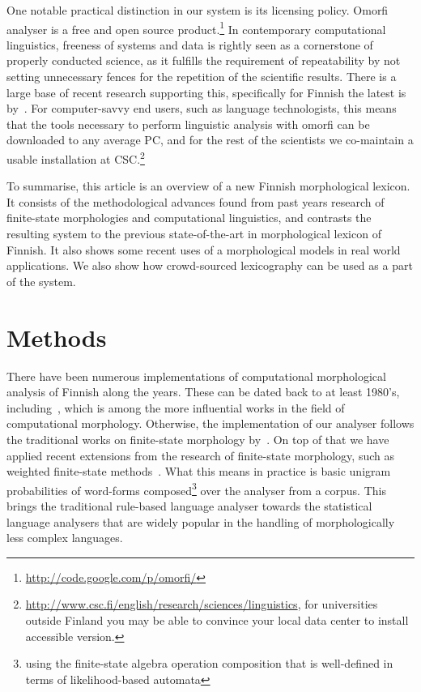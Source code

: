 \documentclass[a4paper,12pt]{article}
\begin{document}
One notable practical distinction in our system is its licensing policy. Omorfi
analyser is a free and open source product.\footnote{
\url{http://code.google.com/p/omorfi/}}  In contemporary computational
linguistics, freeness of systems and data is rightly seen as a cornerstone of
properly conducted science, as it fulfills the requirement of repeatability by
not setting unnecessary fences for the repetition of the scientific results.
There is a large base of recent research supporting this, specifically for
Finnish the latest is by~\citet{koskenniemi2008build}. For computer-savvy end
users, such as language technologists, this means that the tools necessary to
perform linguistic analysis with omorfi can be downloaded to any average PC,
and for the rest of the scientists we co-maintain a usable installation at
CSC.\footnote{\url{http://www.csc.fi/english/research/sciences/linguistics}, 
for universities outside Finland you may be able to convince your local data
center to install accessible version.}

To summarise, this article is an overview of a new Finnish morphological
lexicon.  It consists of the methodological advances found from past years
research of finite-state morphologies and computational linguistics, and
contrasts the resulting system to the previous state-of-the-art in
morphological lexicon of Finnish. It also shows some recent uses of a
morphological models in real world applications. We also show how crowd-sourced
lexicography can be used as a part of the system.

\section{Methods}
\label{sec:methods}

There have been numerous implementations of computational morphological
analysis of Finnish along the years. These  can be dated back to at least
1980's, including~\citet{koskenniemi1983twolevel}, which is among the more
influential works in the field of computational morphology.  Otherwise, the
implementation of our analyser follows the traditional works on finite-state
morphology by~\citet{beesley2003finite}. On top of that we have applied recent
extensions from the research of finite-state morphology, such as weighted
finite-state methods~\citep{openfst,hfst2012}. What this means in practice is
basic unigram probabilities of word-forms composed\footnote{using the
    finite-state algebra operation composition that is well-defined in terms of
likelihood-based automata} over the analyser from a corpus.  This brings the
traditional rule-based language analyser towards the statistical language
analysers that are widely popular in the handling of morphologically less
complex languages.
\end{document}
